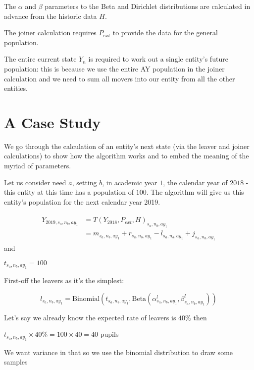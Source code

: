 \documentclass[margin=5mm]{article}
\begin{document}
The $\alpha$ and $\beta$ parameters to the Beta and Dirichlet
distributions are calculated in advance from the historic data $H$.

The joiner calculation requires $P_{ext}$ to provide the data for the
general population.

The entire current state $Y_n$ is required to work out a single
entity's future population: this is because we use the entire AY
population in the joiner calculation and we need to sum all movers
into our entity from all the other entities.

\section{A Case Study}

We go through the calculation of an entity's next state (via the
leaver and joiner calculations) to show how the algorithm works and to
embed the meaning of the myriad of parameters.

Let us consider need $a$, setting $b$, in academic year $1$, the calendar
year of $2018$ - this entity at this time has a population of $100$.  The
algorithm will give us this entity's population for the next calendar
year 2019.

\begin{equation*}
  \begin{aligned}
    \begin{split}
      Y_{2019,s_a,n_b,ay_1} & = T(Y_{2018},P_{ext}, H)_{s_a,n_b,ay_1} \\
      &                    = m_{s_a,n_b,ay_1} + r_{s_a,n_b,ay_1} - l_{s_a,n_b,ay_1} + j_{s_a,n_b,ay_1}
\end{split}
\end{aligned}
\end{equation*}
and

$t_{s_a,n_b,ay_1} = 100$

First-off the leavers as it's the simplest:

\begin{equation*}
l_{s_a,n_b,ay_1} =
  \text{Binomial}(t_{s_a,n_b,ay_1},\text{Beta}(\alpha^l_{s_a,n_b,ay_1},
  \beta^l_{s_a,n_b,ay_1}))
\end{equation*}

Let's say we already know the expected rate of leavers is $40\%$ then

$t_{s_a,n_b,ay_1} \times 40\% = 100 \times 40 = 40$ pupils

We want variance in that so we use the binomial distribution to draw
some samples
\end{document}
